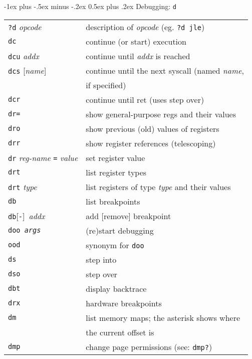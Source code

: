 \documentclass[a4paper,landscape]{article}
\makeatletter
\renewcommand{\section}{\@startsection{section}{1}{0mm}%
                                {-1ex plus -.5ex minus -.2ex}%
                                {0.5ex plus .2ex}%
                                {\normalfont\large\bfseries}}
\makeatother
\begin{document}
\begin{multicols*}{3}
\section{Debugging: \texttt{d}}
\begin{tabular}{@{}ll@{}}
\texttt{?d} \textit{opcode} & description of \textit{opcode} (eg. \texttt{?d jle}) \\
\texttt{dc} & continue (or start) execution \\
\texttt{dcu} \textit{addx} & continue until \textit{addx} is reached \\
\texttt{dcs} [\textit{name}] & continue until the next syscall (named \textit{name}, \\ & if specified) \\
\texttt{dcr} & continue until ret (uses step over) \\
\texttt{dr=} & show general-purpose regs and their values \\
\texttt{dro} & show previous (old) values of registers \\
\texttt{drr} & show register references (telescoping) \\
\texttt{dr} \textit{reg-name} \texttt{=} \textit{value} & set register value \\
\texttt{drt} & list register types \\
\texttt{drt} \textit{type} & list registers of type \textit{type} and their values \\
\texttt{db} & list breakpoints \\
\texttt{db}[\texttt{-}]\ \textit{addx} & add [remove] breakpoint \\
\texttt{doo \textit{args}} & (re)start debugging \\
\texttt{ood} & synonym for \texttt{doo} \\
\texttt{ds} & step into \\
\texttt{dso} & step over \\
\texttt{dbt} & display backtrace \\
\texttt{drx} & hardware breakpoints \\
\texttt{dm} & list memory maps; the asterisk shows where \\ & the current offset is \\
\texttt{dmp} & change page permissions (see: \texttt{dmp?}) \\
\end{tabular}


\end{multicols*}
\end{document}
